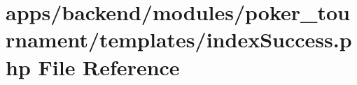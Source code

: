 \hypertarget{backend_2modules_2poker__tournament_2templates_2index_success_8php}{\section{apps/backend/modules/poker\-\_\-tournament/templates/index\-Success.php File Reference}
\label{backend_2modules_2poker__tournament_2templates_2index_success_8php}
}
